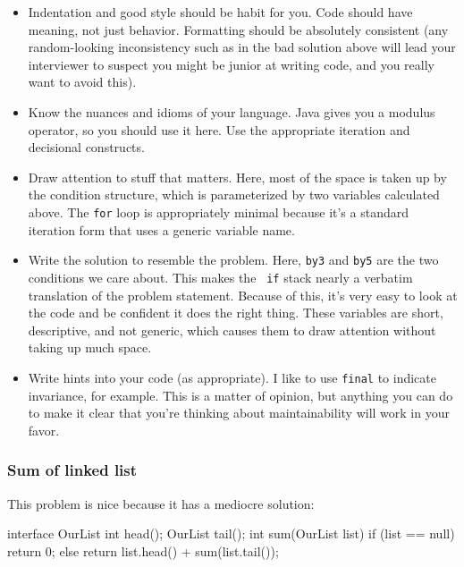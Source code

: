 \documentclass{article}
\begin{document}
\begin{itemize}
\item{Indentation and good style should be habit for you. Code should}
  have meaning, not just behavior. Formatting should be absolutely
  consistent (any random-looking inconsistency such as in the bad
  solution above will lead your interviewer to suspect you might be
  junior at writing code, and you really want to avoid this).

\item{Know the nuances and idioms of your language. Java gives you a}
  modulus operator, so you should use it here. Use the appropriate
  iteration and decisional constructs.

\item{Draw attention to stuff that matters. Here, most of the space is}
  taken up by the condition structure, which is parameterized by two
  variables calculated above. The {\tt for} loop is appropriately
  minimal because it's a standard iteration form that uses a generic
  variable name.

\item{Write the solution to resemble the problem. Here, {\tt by3} and}
  {\tt by5} are the two conditions we care about. This makes the {\tt
  if} stack nearly a verbatim translation of the problem statement.
  Because of this, it's very easy to look at the code and be confident
  it does the right thing. These variables are short, descriptive, and
  not generic, which causes them to draw attention without taking up
  much space.

\item{Write hints into your code (as appropriate). I like to use}
  {\tt final} to indicate invariance, for example. This is a matter of
  opinion, but anything you can do to make it clear that you're
  thinking about maintainability will work in your favor.
\end{itemize}

\subsubsection{Sum of linked list}
      This problem is nice because it has a mediocre solution:

\begin{javacode}
interface OurList {
  int head();
  OurList tail();
}
int sum(OurList list) {
  if (list == null)
    return 0;
  else
    return list.head() + sum(list.tail());
} \end{javacode}
\end{document}
